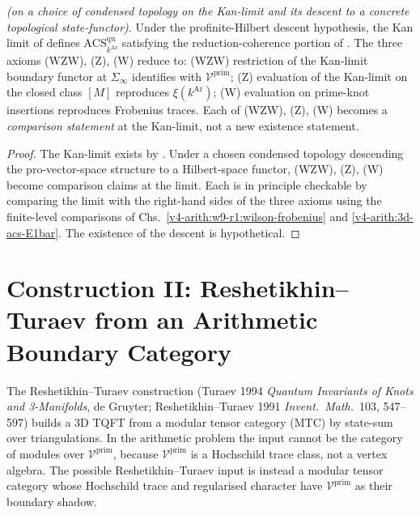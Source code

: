 \begin{theorem}
\label{v4-arith:w10-a:thm:construction-I-closure}
\ClaimStatusProvedHereConditional \emph{(on a choice of condensed
topology on the Kan-limit and its descent to a concrete
topological state-functor)}. Under the profinite-Hilbert descent
hypothesis, the Kan limit of
 defines
\(\mathrm{ACS}^{\mathrm{qu}}_{k^{\mathrm{Ar}}}\) satisfying the
reduction-coherence portion of
. The three axioms (WZW), (Z),
(W) reduce to: (WZW) restriction of the Kan-limit boundary functor
at \(\Sigma_{\infty}\) identifies with
\(\mathcal V^{\mathrm{prim}}\); (Z) evaluation of the Kan-limit on
the closed class \([M]\) reproduces \(\xi(k^{\mathrm{Ar}})\);
(W) evaluation on prime-knot insertions reproduces Frobenius traces.
Each of (WZW), (Z), (W) becomes a \emph{comparison statement} at the
Kan-limit, not a new existence statement.
\end{theorem}

\begin{proof}
The Kan-limit exists by .
Under a chosen condensed topology descending the pro-vector-space
structure to a Hilbert-space functor, (WZW), (Z), (W) become
comparison claims at the limit. Each is in principle checkable by
comparing the limit with the right-hand sides of the three axioms
using the finite-level comparisons of Chs.~\ref{v4-arith:w9-r1:wilson-frobenius}
and \ref{v4-arith:3d-acs-E1bar}. The existence of the descent is
hypothetical.
\end{proof}

\section{Construction II: Reshetikhin--Turaev from an Arithmetic Boundary Category}
\label{v4-arith:w10-a:construction-II}

The Reshetikhin--Turaev construction (Turaev 1994
\emph{Quantum Invariants of Knots and 3-Manifolds}, de Gruyter;
Reshetikhin--Turaev 1991 \emph{Invent.~Math.}~103, 547--597)
builds a 3D TQFT from a modular tensor category (MTC) by
state-sum over triangulations. In the arithmetic problem the input
cannot be the category of modules over \(\mathcal V^{\mathrm{prim}}\),
because \(\mathcal V^{\mathrm{prim}}\) is a Hochschild trace class, not
a vertex algebra. The possible Reshetikhin--Turaev input is instead a
modular tensor category whose Hochschild trace and regularised
character have \(\mathcal V^{\mathrm{prim}}\) as their boundary shadow.

